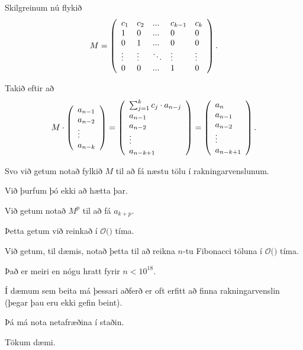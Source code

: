 {
	{
		\item<1-> Skilgreinum nú flykið
		\[
			M = \left (
			\env{array}
			{ {l l l l l}
				c_1 & c_2 & ... & c_{k - 1} & c_k\\
				1 & 0 & ... & 0 & 0\\
				0 & 1 & ... & 0 & 0\\
				\vdots & \vdots & \ddots & \vdots & \vdots\\
				0 & 0 & ... & 1 & 0
			}
			\right ).
		\]
		\item<2-> Takið eftir að
		\[
			M
			\cdot
			\left (
			\env{array}
			{ {l}
				a_{n - 1}\\
				a_{n - 2}\\
				\vdots\\
				a_{n - k}
			}
			\right )
			=
			\left (
			\env{array}
			{ {l}
				\sum_{j = 1}^k c_j \cdot a_{n - j}\\
				a_{n - 1}\\
				a_{n - 2}\\
				\vdots\\
				a_{n - k + 1}
			}
			\right )
			=
			\left (
			\env{array}
			{ {l}
				a_n\\
				a_{n - 1}\\
				a_{n - 2}\\
				\vdots\\
				a_{n - k + 1}
			}
			\right ).
		\]
		\item<3-> Svo við getum notað fylkið $M$ til að fá næstu tölu í rakningarvenslunum.
	}
}

{
	{
		\item<1-> Við þurfum þó ekki að hætta þar.
		\item<2-> Við getum notað $M^p$ til að fá $a_{k + p}$.
		\item<3-> Þetta getum við reinkað í $\mathcal{O}($$)$ tíma.
		\item<5-> Við getum, til dæmis, notað þetta til að reikna $n$-tu Fibonacci töluna í $\mathcal{O}($$)$ tíma.
		\item<7-> Það er meiri en nógu hratt fyrir $n < 10^{18}$.
	}
}

{
}

{
	{
		\item<1-> Í dæmum sem beita má þessari aðferð er oft erfitt að finna rakningarvenslin (þegar þau eru ekki gefin beint).
		\item<2-> Þá má nota netafræðina í staðin.
		\item<3-> Tökum dæmi.
	}
}

